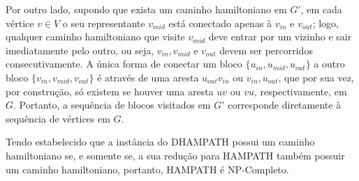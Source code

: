 Por outro lado, supondo que exista um caminho hamiltoniano em $G'$, em cada vértice $v\in V$ o seu representante $v_{mid}$ está conectado apenas à $v_{in}$ e $v_{out}$; logo, qualquer caminho hamiltoniano que visite $v_{mid}$ deve entrar por um vizinho e sair imediatamente pelo outro, ou seja, $v_{in},v_{mid}$ e $v_{out}$ devem ser percorridos consecutivamente. A única forma de conectar um bloco $\{u_{in},u_{mid},u_{out}\}$ a outro bloco $\{v_{in},v_{mid},v_{out}\}$ é através de uma aresta $u_{out}v_{in}$ ou $v_{in},u_{out}$, que por sua vez, por construção, só existem se houver uma aresta $uv$ ou $vu$, respectivamente, em $G$. Portanto, a sequência de blocos visitados em $G'$ corresponde diretamente à sequência de vértices em $G$.

Tendo estabelecido que a instância do DHAMPATH possui um caminho hamiltoniano se, e somente se, a sua redução para HAMPATH também possuir um caminho hamiltoniano, portanto, HAMPATH é NP-Completo.